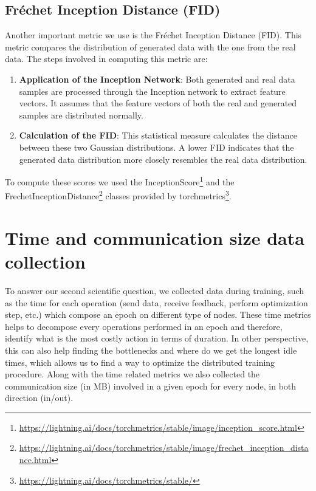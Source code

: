 \subsection{Fréchet Inception Distance (FID)}
Another important metric we use is the Fréchet Inception Distance (FID). This metric compares the distribution of generated data with the one from the real data. The steps involved in computing this metric are:

\begin{enumerate}
    \item \textbf{Application of the Inception Network}: Both generated and real data samples are processed through the Inception network to extract feature vectors. It assumes that the feature vectors of both the real and generated samples are distributed normally.
    \item \textbf{Calculation of the FID}: This statistical measure calculates the distance between these two Gaussian distributions. A lower FID indicates that the generated data distribution more closely resembles the real data distribution.
\end{enumerate}

To compute these scores we used the InceptionScore\footnote{\url{https://lightning.ai/docs/torchmetrics/stable/image/inception_score.html}} and the FrechetInceptionDistance\footnote{\url{https://lightning.ai/docs/torchmetrics/stable/image/frechet_inception_distance.html}} classes provided by torchmetrics\footnote{\url{https://lightning.ai/docs/torchmetrics/stable/}}.

\section{Time and communication size data collection}
To answer our second scientific question, we collected data during training, such as the time for each operation (send data, receive feedback, perform optimization step, etc.) which compose an epoch on different type of nodes. These time metrics helps to decompose every operations performed in an epoch and therefore, identify what is the most costly action in terms of duration. In other perspective, this can also help finding the bottlenecks and where do we get the longest idle times, which allows us to find a way to optimize the distributed training procedure. Along with the time related metrics we also collected the communication size (in MB) involved in a given epoch for every node, in both direction (in/out).


